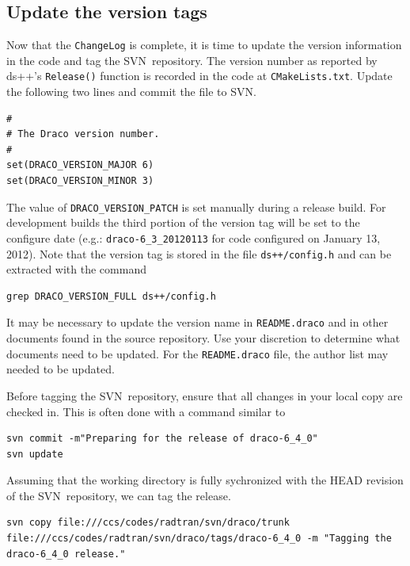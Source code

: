 \documentclass[note]{newmemo}
\newcommand{\svn}{\textsf{SVN}}
\begin{document}
\subsection{Update the version tags}
\label{sec:update_tags}

Now that the \texttt{ChangeLog} is complete, it is time to update the
version information in the code and tag the \svn\ repository.  The
version number as reported by \textsf{ds++}'s \texttt{Release()}
function is recorded in the code at \texttt{CMakeLists.txt}.  Update
the following two lines and commit the file to \svn.
%
\begin{lstlisting}[basicstyle=\footnotesize, xleftmargin=2.0in, 
  xrightmargin=2.0in]
#
# The Draco version number.
#
set(DRACO_VERSION_MAJOR 6)
set(DRACO_VERSION_MINOR 3)
\end{lstlisting}
% 
The value of \texttt{DRACO\_VERSION\_PATCH} is set manually during a
release build.  For development builds the third portion of the
version tag will be set to the configure date (e.g.:
\texttt{draco-6\_3\_20120113} for code configured on January 13,
2012).  Note that the version tag is stored in the file
\texttt{ds++/config.h} and can be extracted with the command
\begin{lstlisting}[basicstyle=\footnotesize, xleftmargin=2.0in, 
  xrightmargin=2.0in]
grep DRACO_VERSION_FULL ds++/config.h 
\end{lstlisting}

It may be necessary to update the version name in
\texttt{README.draco} and in other documents found in the source
repository.  Use your discretion to determine what documents need to
be updated.  For the \texttt{README.draco} file, the author list may
needed to be updated.

Before tagging the \svn\ repository, ensure that all changes in your
local copy are checked in.  This is often done with a command similar
to
%
\begin{lstlisting}[basicstyle=\footnotesize, xleftmargin=1.0in, 
  xrightmargin=1.0in]
svn commit -m"Preparing for the release of draco-6_4_0"
svn update 
\end{lstlisting}
%
Assuming that the working directory is fully sychronized with the HEAD
revision of the \svn\ repository, we can tag the release.
%
\begin{lstlisting}[basicstyle=\footnotesize, xleftmargin=2.0in, 
  xrightmargin=2.0in]
svn copy file:///ccs/codes/radtran/svn/draco/trunk file:///ccs/codes/radtran/svn/draco/tags/draco-6_4_0 -m "Tagging the draco-6_4_0 release."
\end{lstlisting}
\end{document}
